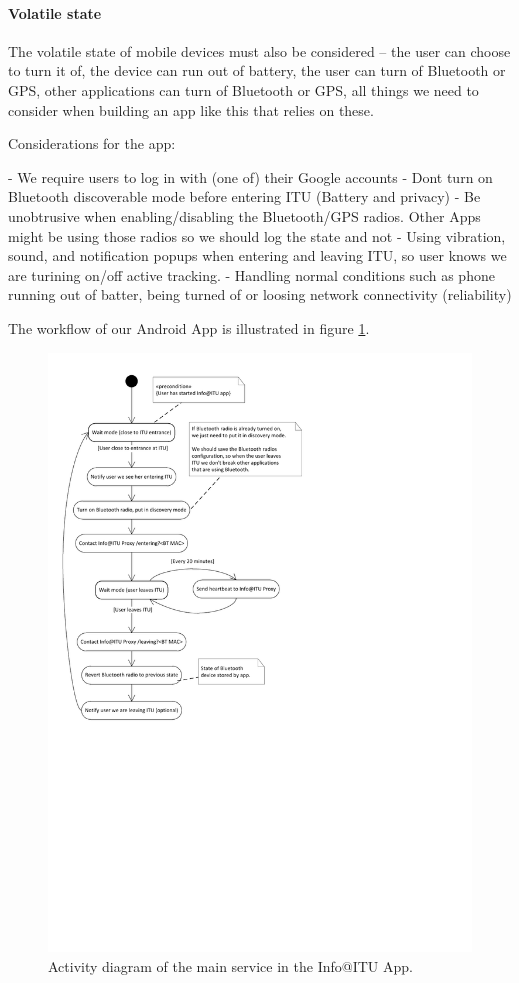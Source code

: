 \documentclass{ubicomp2011}
\begin{document}
    \paragraph{Volatile state} The volatile state of mobile devices must also be considered -- the user can choose to turn it of, the device can run out of battery, the user can turn of Bluetooth or GPS, other applications can turn of Bluetooth or GPS, all things we need to consider when building an app like this that relies on these.
    
    
    
Considerations for the app:

- We require users to log in with (one of) their Google accounts
- Dont turn on Bluetooth discoverable mode before entering ITU (Battery and privacy)
- Be unobtrusive when enabling/disabling the Bluetooth/GPS radios. Other Apps might be using those radios so we should log the state and not 
- Using vibration, sound, and notification popups when entering and leaving ITU, so user knows we are turining on/off active tracking.
- Handling normal conditions such as phone running out of batter, being turned of or loosing network connectivity (reliability)


The workflow of our Android App is illustrated in figure \ref{fig:android-app-activity-diagram}. 
 
\begin{figure}[t]
\begin{center}
\includegraphics[width=0.90\columnwidth]{android-app-activity-diagram.pdf}
\end{center}
\caption{Activity diagram of the main service in the Info@ITU App.}
\label{fig:android-app-activity-diagram}
\end{figure}




\end{document}
